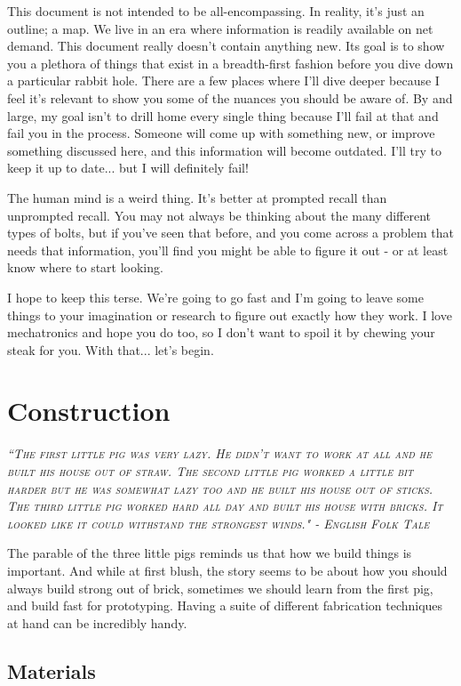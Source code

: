 \documentclass[10pt,letterpaper]{book}
\begin{document}
This document is not intended to be all-encompassing. In reality, it's just an outline; a map. We live in an era where information is readily available on net demand. This document really doesn't contain anything new. Its goal is to show you a plethora of things that exist in a breadth-first fashion before you dive down a particular rabbit hole. There are a few places where I'll dive deeper because I feel it's relevant to show you some of the nuances you should be aware of. By and large, my goal isn't to drill home every single thing because I'll fail at that and fail you in the process. Someone will come up with something new, or improve something discussed here, and this information will become outdated. I'll try to keep it up to date... but I will definitely fail!

The human mind is a weird thing. It's better at prompted recall than unprompted recall. You may not always be thinking about the many different types of bolts, but if you've seen that before, and you come across a problem that needs that information, you'll find you might be able to figure it out - or at least know where to start looking.

I hope to keep this terse. We're going to go fast and I'm going to leave some things to your imagination or research to figure out exactly how they work. I love mechatronics and hope you do too, so I don't want to spoil it by chewing your steak for you. With that... let's begin.

\chapter{Construction}
 
 {\slshape \scshape ``The first little pig was very lazy. He didn't want to work at all and he built his house out of straw. The second little pig worked a little bit harder but he was somewhat lazy too and he built his house out of sticks. The third little pig worked hard all day and built his house with bricks. It looked like it could withstand the strongest winds." - English Folk Tale}
 
 The parable of the three little pigs reminds us that how we build things is important. And while at first blush, the story seems to be about how you should always build strong out of brick, sometimes we should learn from the first pig, and build fast for prototyping. Having a suite of different fabrication techniques at hand can be incredibly handy.
 
 \section{Materials}
 
\end{document}
